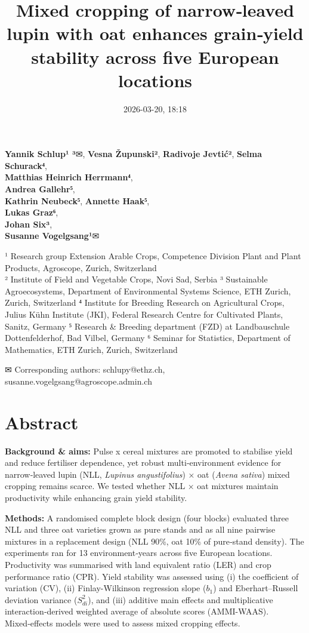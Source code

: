 \documentclass[
  british,
  a4paper,
  DIV=11,
  numbers=noendperiod]{scrreprt}
\title{Mixed cropping of narrow‑leaved lupin with oat enhances
grain‑yield stability across five European locations}
\author{}
\date{2026-03-20, 18:18}
\renewcommand*\contentsname{Table of contents}
\newcommand\contentsname{Table of contents}
\begin{document}
\maketitle

\renewcommand*\contentsname{Table of contents}
{
\hypersetup{linkcolor=}
\setcounter{tocdepth}{2}
\tableofcontents
}

\textbf{Yannik Schlup¹ ³}✉, \textbf{Vesna Župunski²}, \textbf{Radivoje
Jevtić²}, \textbf{Selma Schurack⁴},\\
\textbf{Matthias Heinrich Herrmann⁴},\\
\textbf{Andrea Gallehr⁵},\\
\textbf{Kathrin Neubeck⁵}, \textbf{Annette Haak⁵},\\
\textbf{Lukas Graz⁶},\\
\textbf{Johan Six³},\\
\textbf{Susanne Vogelgsang¹}✉

¹ Research group Extension Arable Crops, Competence Division Plant and
Plant Products, Agroscope, Zurich, Switzerland\\
² Institute of Field and Vegetable Crops, Novi Sad, Serbia ³ Sustainable
Agroecosystems, Department of Environmental Systems Science, ETH Zurich,
Zurich, Switzerland ⁴ Institute for Breeding Research on Agricultural
Crops, Julius Kühn Institute (JKI), Federal Research Centre for
Cultivated Plants, Sanitz, Germany ⁵ Research \& Breeding department
(FZD) at Landbauschule Dottenfelderhof, Bad Vilbel, Germany ⁶ Seminar
for Statistics, Department of Mathematics, ETH Zurich, Zurich,
Switzerland

✉ Corresponding authors: schlupy@ethz.ch,
susanne.vogelgsang@agroscope.admin.ch

\chapter{Abstract}\label{abstract}

\textbf{Background \& aims:} Pulse x cereal mixtures are promoted to
stabilise yield and reduce fertiliser dependence, yet robust
multi‑environment evidence for narrow‑leaved lupin (NLL, \emph{Lupinus
angustifolius}) × oat (\emph{Avena sativa}) mixed cropping remains
scarce. We tested whether NLL × oat mixtures maintain productivity while
enhancing grain yield stability.

\textbf{Methods:} A randomised complete block design (four blocks)
evaluated three NLL and three oat varieties grown as pure stands and as
all nine pairwise mixtures in a replacement design (NLL 90\%, oat 10\%
of pure‑stand density). The experiments ran for 13 environment‑years
across five European locations. Productivity was summarised with land
equivalent ratio (LER) and crop performance ratio (CPR). Yield stability
was assessed using (i) the coefficient of variation (CV), (ii)
Finlay-Wilkinson regression slope (\(b_{1}\)) and Eberhart--Russell
deviation variance (\(S^2_{di}\)), and (iii) additive main effects and
multiplicative interaction‑derived weighted average of absolute scores
(AMMI-WAAS). Mixed‑effects models were used to assess mixed cropping
effects.
\end{document}
